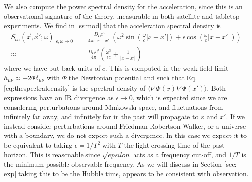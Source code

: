 \documentclass[aps,preprintnumbers,superscriptaddress,longbibliography]{revtex4-1}
\begin{document}
We also compute the power spectral density for the acceleration, since this is an observational signature of the theory, measurable in both satellite and tabletop experiments. 
%
%
%
%
%
%
%
We find in \ref{ss:mod} that the acceleration spectral density is
\begin{align}
\label{eq:thespectraldensity}
     S_{aa}(\vec{x},\vec{x}';\omega)|_{\epsilon, \omega\rightarrow 0}=&\frac{D_Gc^3}{4\pi \epsilon |x-x'|}\left(\omega^2 \sin(\frac{\omega}{c}|x-x'|)+\epsilon\cos(\frac{\omega}{c}|x-x'|)\right)
     \nonumber\\
     \approx&\frac{D_Gc^3}{4\pi}\left(\frac{\omega^3}{\epsilon c} +\frac{1}{|x-x'|}\right)
\end{align}
%
where we have put back units of $c$.  %
This is computed in the weak field limit $h_{\mu\nu}\approx-2\Phi\delta_{\mu\nu}$ with $\Phi$ the Newtonian potential and such that Eq. \eqref{eq:thespectraldensity} is the spectral density of $\langle\nabla\Phi(x)\nabla\Phi(x')\rangle$. %
Both expressions have an IR divergence as $\epsilon\rightarrow 0$, which is expected since we 
 are
 considering perturbations around Minkowski space, and fluctuations from infinitely far away, and infinitely far in the past will propagate to $x$ and $x'$. If we instead consider perturbations 
 around Friedman-Robertson-Walker, or a universe with a boundary, we do not expect such a divergence. In this case
we expect it to be equivalent to taking  $\epsilon=1/T^2$ with $T$ the light crossing time of the past horizon. This is reasonable since $\sqrt{epsilon}$ acts as a frequency cut-off, and $1/T$ is the minimum possible observable frequency. As we will discuss in Section \ref{sec: exp} taking this to be the Hubble time, appears to be consistent with observation. 
\end{document}
